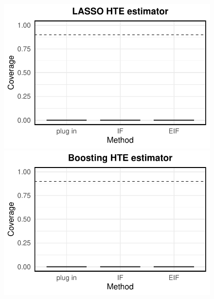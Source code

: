 \documentclass[twoside]{article}
\newcommand{\1}{{\mathbbm{1}}}
\begin{document}
\begin{figure}[ht]
\begin{minipage}{0.15\textwidth}
                \includegraphics[clip, trim = 0cm 0cm 0cm 0cm, width = \textwidth]{plot/simulation_gradient_boosting_coverage_LASSO.pdf}
        \end{minipage}
        \begin{minipage}{0.15\textwidth}
                \centering
                \includegraphics[clip, trim = 0cm 0cm 0cm 0cm, width = \textwidth]{plot/simulation_gradient_boosting_coverage_Boosting.pdf}
        \end{minipage}
        \begin{minipage}{0.15\textwidth}
                \centering

\end{minipage}
\end{figure}
\end{document}
